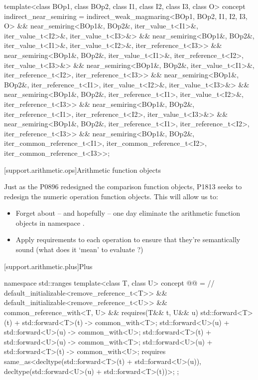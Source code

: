 \begin{itemdecl}
template<class BOp1, class BOp2, class I1, class I2, class I3, class O>
concept indirect_near_semiring =
  indirect_weak_magmaring<BOp1, BOp2, I1, I2, I3, O> &&
  near_semiring<BOp1&, BOp2&, iter_value_t<I1>&, iter_value_t<I2>&, iter_value_t<I3>&> &&
  near_semiring<BOp1&, BOp2&, iter_value_t<I1>&, iter_value_t<I2>&, iter_reference_t<I3>> &&
  near_semiring<BOp1&, BOp2&, iter_value_t<I1>&, iter_reference_t<I2>, iter_value_t<I3>&> &&
  near_semiring<BOp1&, BOp2&, iter_value_t<I1>&, iter_reference_t<I2>, iter_reference_t<I3>> &&
  near_semiring<BOp1&, BOp2&, iter_reference_t<I1>, iter_value_t<I2>&, iter_value_t<I3>&> &&
  near_semiring<BOp1&, BOp2&, iter_reference_t<I1>, iter_value_t<I2>&, iter_reference_t<I3>> &&
  near_semiring<BOp1&, BOp2&, iter_reference_t<I1>, iter_reference_t<I2>, iter_value_t<I3>&> &&
  near_semiring<BOp1&, BOp2&, iter_reference_t<I1>, iter_reference_t<I2>, iter_reference_t<I3>> &&
  near_semiring<BOp1&, BOp2&, iter_common_reference_t<I1>, iter_common_reference_t<I2>,
    iter_common_reference_t<I3>>;
\end{itemdecl}

[support.arithmetic.ops]{Arithmetic function objects}

Just as the P0896 redesigned the comparison function objects, P1813 seeks to redesign the numeric
operation function objects. This will allow us to:

\begin{itemize}
   \item Forget about -- and hopefully -- one day eliminate the arithmetic function objects in
         namespace .
   \item Apply requirements to each operation to ensure that they're semantically sound (what does
         it `mean' to evaluate ?)
\end{itemize}

[support.arithmetic.plus]{Plus}

\begin{itemdecl}
namespace std::ranges {
  template<class T, class U>
  concept @@ = // \expos
    default_initializable<remove_reference_t<T>> &&
    default_initializable<remove_reference_t<U>> &&
    common_reference_with<T, U> &&
    requires(T&& t, U&& u) {
      { std::forward<T>(t) + std::forward<T>(t) } -> common_with<T>;
      { std::forward<U>(u) + std::forward<U>(u) } -> common_with<U>;
      { std::forward<T>(t) + std::forward<U>(u) } -> common_with<T>;
      { std::forward<U>(u) + std::forward<T>(t) } -> common_with<U>;
      requires same_as<decltype(std::forward<T>(t) + std::forward<U>(u)),
                       decltype(std::forward<U>(u) + std::forward<T>(t))>;
    };
}
\end{itemdecl}

